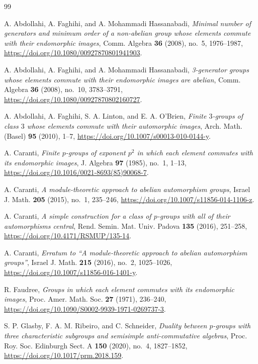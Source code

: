 \documentclass[11pt]{amsart}
\theoremstyle{definition}
\theoremstyle{remark}
\begin{document}
\begin{thebibliography}{99}

A. Abdollahi, A. Faghihi, and A. Mohammadi Hassanabadi,
\emph{Minimal number of generators and minimum order of a non-abelian
group whose elements commute with their endomorphic images},
Comm. Algebra \textbf{36} (2008), no.~5, 1976--1987,
\url{https://doi.org/10.1080/00927870801941903}.

A. Abdollahi, A. Faghihi, and A. Mohammadi Hassanabadi,
\emph{3-generator groups whose elements commute with their endomorphic
images are abelian},
Comm. Algebra \textbf{36} (2008), no.~10, 3783--3791,
\url{https://doi.org/10.1080/00927870802160727}.

A. Abdollahi, A. Faghihi, S. A. Linton, and E. A. O'Brien,
\emph{Finite $3$-groups of class $3$ whose elements commute with their
automorphic images},
Arch. Math. (Basel) \textbf{95} (2010), 1--7,
\url{https://doi.org/10.1007/s00013-010-0144-y}.

A. Caranti,
\emph{Finite $p$-groups of exponent $p^2$ in which each element commutes
with its endomorphic images},
J. Algebra \textbf{97} (1985), no.~1, 1--13,
\url{https://doi.org/10.1016/0021-8693(85)90068-7}.

A. Caranti,
\emph{A module-theoretic approach to abelian automorphism groups},
Israel J. Math. \textbf{205} (2015), no.~1, 235--246,
\url{https://doi.org/10.1007/s11856-014-1106-z}.

A. Caranti,
\emph{A simple construction for a class of $p$-groups with all of their
automorphisms central},
Rend. Semin. Mat. Univ. Padova \textbf{135} (2016), 251--258,
\url{https://doi.org/10.4171/RSMUP/135-14}.

A. Caranti,
\emph{Erratum to ``A module-theoretic approach to abelian automorphism
groups''},
Israel J. Math. \textbf{215} (2016), no.~2, 1025--1026,
\url{https://doi.org/10.1007/s11856-016-1401-y}.

R. Faudree,
\emph{Groups in which each element commutes with its endomorphic images},
Proc. Amer. Math. Soc. \textbf{27} (1971), 236--240,
\url{https://doi.org/10.1090/S0002-9939-1971-0269737-3}.

S. P. Glasby, F. A. M. Ribeiro, and C. Schneider,
\emph{Duality between $p$-groups with three characteristic subgroups and
semisimple anti-commutative algebras},
Proc. Roy. Soc. Edinburgh Sect. A \textbf{150} (2020), no.~4, 1827--1852,
\url{https://doi.org/10.1017/prm.2018.159}.


\end{thebibliography}
\end{document}
